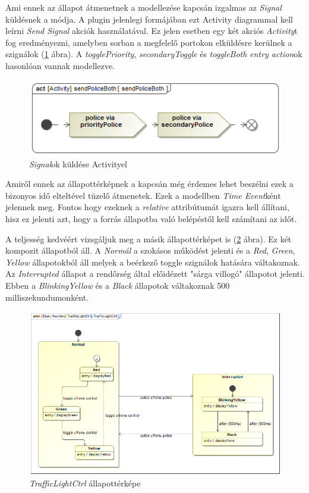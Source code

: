 Ami ennek az állapot átmenetnek a modellezése kapcsán izgalmas az \emph{Signal} küldésnek a módja. A plugin jelenlegi formájában ezt Activity diagrammal kell leírni \emph{Send Signal} akciók használatával. Ez jelen esetben egy két akciós \emph{Activity}t fog eredményezni, amelyben sorban a megfelelő portokon elküldésre kerülnek a szignálok (\ref{fig:activity} ábra).  A \emph{togglePriority}, \emph{secondaryToggle} és \emph{toggleBoth} \emph{entry action}ok hasonlóan vannak modellezve.

\begin{figure}[!ht]
	\centering
	\includegraphics[width=12cm, keepaspectratio]{figures/contribution/sendPoliceBoth.png}
	\caption{\emph{Signal}ok küldése Activityel}
	\label{fig:activity}
\end{figure}

Amiről ennek az állapottérképnek a kapcsán még érdemes lehet beszélni ezek a bizonyos idő elteltével tüzelő átmenetek. Ezek a modellben \emph{Time Event}ként jelennek meg. Fontos hogy ezeknek a \emph{relative} attribútumát igazra kell állítani, hisz ez jelenti azt, hogy a forrás állapotba való belépéstől kell számítani az időt.

A teljesség kedvéért vizsgáljuk meg a másik állapottérképet is (\ref{fig:LightCtrlSM} ábra). Ez két kompozit állapotból áll. A \emph{Normál} a szokásos működést jelenti és a \emph{Red}, \emph{Green}, \emph{Yellow} állapotokból áll melyek a beérkező toggle szignálok hatására váltakoznak.
Az \emph{Interrupted} állapot a rendőrség által előidézett "sárga villogó" állapotot jelenti. Ebben a \emph{BlinkingYellow} és a \emph{Black} állapotok váltakoznak 500 milliszekundumonként.  

\begin{figure}[!ht]
	\centering
	\includegraphics[width=12cm, keepaspectratio]{figures/contribution/TrafficLightCtrlSM.png}
	\caption{\emph{TrafficLightCtrl} állapottérképe}
	\label{fig:LightCtrlSM}
\end{figure}


